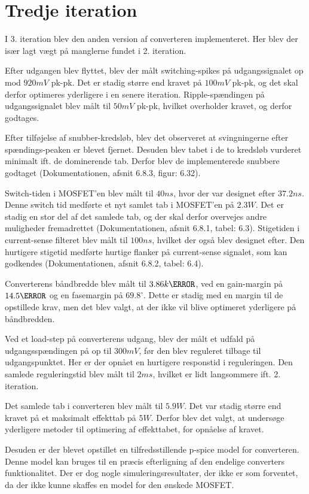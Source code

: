 
\section{Tredje iteration}
I 3. iteration blev den anden version af converteren implementeret. Her blev der især lagt vægt på manglerne fundet i 2. iteration. 

Efter udgangen blev flyttet, blev der målt switching-spikes på udgangssignalet op mod $920mV$ pk-pk. Det er stadig større end kravet på $100mV$ pk-pk, og det skal derfor optimeres yderligere i en senere iteration. Ripple-spændingen på udgangssignalet blev målt til $50mV$ pk-pk, hvilket overholder kravet, og derfor godtages.

Efter tilføjelse af snubber-kredsløb, blev det observeret at svingningerne efter spændings-peaken er blevet fjernet. Desuden blev tabet i de to kredsløb vurderet minimalt ift. de dominerende tab. Derfor blev de implementerede snubbere godtaget (Dokumentationen, afsnit 6.8.3, figur: 6.32).

Switch-tiden i MOSFET'en blev målt til $40ns$, hvor der var designet efter $37.2ns$. Denne switch tid medførte et nyt samlet tab i MOSFET'en på $2.3W$. Det er stadig en stor del af det samlede tab, og der skal derfor overvejes andre muligheder fremadrettet (Dokumentationen, afsnit 6.8.1, tabel: 6.3). Stigetiden i current-sense filteret blev målt til $100ns$, hvilket der også blev designet efter. Den hurtigere stigetid medførte hurtige flanker på current-sense signalet, som kan godkendes (Dokumentationen, afsnit 6.8.2, tabel: 6.4).

Converterens båndbredde blev målt til $3.86k\hertz$, ved en gain-margin på $14.5\decibel$ og en fasemargin på $69.8^\circ$. Dette er stadig med en margin til de opstillede krav, men det blev valgt, at der ikke vil blive optimeret yderligere på båndbredden. 

Ved et load-step på converterens udgang, blev der målt et udfald på udgangsspændingen på op til $300mV$, før den blev reguleret tilbage til udgangspunktet. Her er der opnået en hurtigere responstid i reguleringen. Den samlede reguleringstid blev målt til $2ms$, hvilket er lidt langsommere ift. 2. iteration. 

Det samlede tab i converteren blev målt til $5.9W$. Det var stadig større end kravet på et maksimalt effekttab på $5W$. Derfor blev det valgt, at undersøge yderligere metoder til optimering af effekttabet, for opnåelse af kravet. 

Desuden er der blevet opstillet en tilfredsstillende p-spice model for converteren. Denne model kan bruges til en præcis efterligning af den endelige converters funktionalitet. Der er dog nogle simuleringsresultater, der ikke er som forventet, da der ikke kunne skaffes en model for den ønskede MOSFET. 

